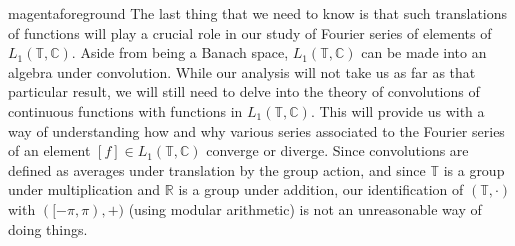 \documentclass[notoc,notitlepage]{tufte-book}
\begin{document}
\begin{quotebox}{magenta}{foreground}
The last thing that we need to know is that such translations of functions will
play a crucial role in our study
of Fourier series of elements of $L_1(\mathbb{T}, \mathbb{C})$.
Aside from being a Banach space, $L_1(\mathbb{T}, \mathbb{C})$ can be made
into an algebra under convolution.
While our analysis will not take us as far as that particular result,
we will still need to delve into the theory of convolutions of continuous functions
with functions in $L_1(\mathbb{T}, \mathbb{C})$.
This will provide us with a way of understanding how and why various series
associated to the Fourier series of an element $[f] \in L_1(\mathbb{T}, \mathbb{C})$
converge or diverge.
Since convolutions are defined as averages under translation by the group action,
and since $\mathbb{T}$ is a group under multiplication
and $\mathbb{R}$ is a group under addition,
our identification of $(\mathbb{T}, \cdot)$ with $([-\pi, \pi), +)$
(using modular arithmetic) is not an unreasonable way of doing things.
\end{quotebox}


\backmatter

\fancyhead[LE]{\thepage \enspace \textsl{\leftmark}}



\printindex
\end{document}
